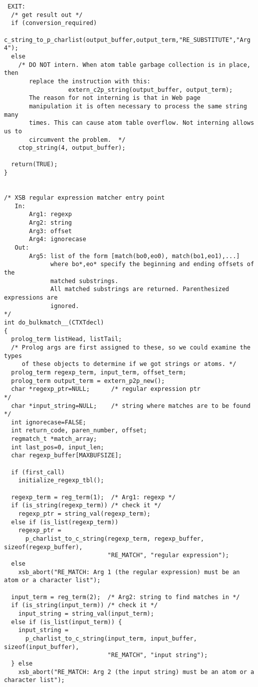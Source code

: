{\begin{verbatim}
 EXIT:
  /* get result out */
  if (conversion_required)
    c_string_to_p_charlist(output_buffer,output_term,"RE_SUBSTITUTE","Arg 4");
  else
    /* DO NOT intern. When atom table garbage collection is in place, then
       replace the instruction with this:
                  extern_c2p_string(output_buffer, output_term);
       The reason for not interning is that in Web page
       manipulation it is often necessary to process the same string many
       times. This can cause atom table overflow. Not interning allows us to
       circumvent the problem.  */
    ctop_string(4, output_buffer);
  
  return(TRUE);
}


/* XSB regular expression matcher entry point
   In:
       Arg1: regexp
       Arg2: string
       Arg3: offset
       Arg4: ignorecase
   Out:
       Arg5: list of the form [match(bo0,eo0), match(bo1,eo1),...]
             where bo*,eo* specify the beginning and ending offsets of the
             matched substrings.
             All matched substrings are returned. Parenthesized expressions are
             ignored.
*/
int do_bulkmatch__(CTXTdecl)
{
  prolog_term listHead, listTail;
  /* Prolog args are first assigned to these, so we could examine the types
     of these objects to determine if we got strings or atoms. */
  prolog_term regexp_term, input_term, offset_term;
  prolog_term output_term = extern_p2p_new();
  char *regexp_ptr=NULL;      /* regular expression ptr               */
  char *input_string=NULL;    /* string where matches are to be found */
  int ignorecase=FALSE;
  int return_code, paren_number, offset;
  regmatch_t *match_array;
  int last_pos=0, input_len;
  char regexp_buffer[MAXBUFSIZE];

  if (first_call)
    initialize_regexp_tbl();

  regexp_term = reg_term(1);  /* Arg1: regexp */
  if (is_string(regexp_term)) /* check it */
    regexp_ptr = string_val(regexp_term);
  else if (is_list(regexp_term))
    regexp_ptr =
      p_charlist_to_c_string(regexp_term, regexp_buffer, sizeof(regexp_buffer),
                             "RE_MATCH", "regular expression");
  else
    xsb_abort("RE_MATCH: Arg 1 (the regular expression) must be an atom or a character list");

  input_term = reg_term(2);  /* Arg2: string to find matches in */
  if (is_string(input_term)) /* check it */
    input_string = string_val(input_term);
  else if (is_list(input_term)) {
    input_string =
      p_charlist_to_c_string(input_term, input_buffer, sizeof(input_buffer),
                             "RE_MATCH", "input string");
  } else
    xsb_abort("RE_MATCH: Arg 2 (the input string) must be an atom or a character list");


\end{verbatim}}
